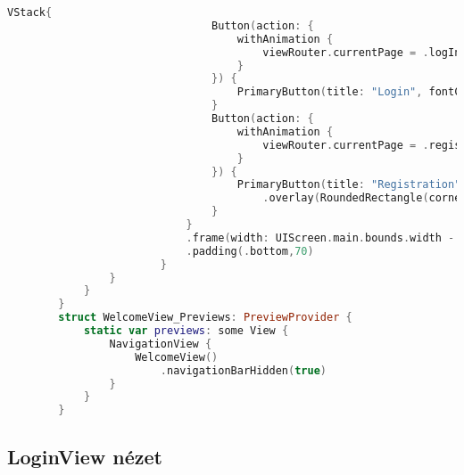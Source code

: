 \begin{minipage}{\textwidth}
\begin{lstlisting}[language=swift]
                            VStack{
                                Button(action: {
                                    withAnimation {
                                        viewRouter.currentPage = .logInPage
                                    }
                                }) {
                                    PrimaryButton(title: "Login", fontColor: Color.theme.white, backgroundColor: Color.theme.lighBlue)
                                }
                                Button(action: {
                                    withAnimation {
                                        viewRouter.currentPage = .registerPage
                                    }
                                }) {
                                    PrimaryButton(title: "Registration", fontColor: Color.theme.lighBlue, backgroundColor: Color.theme.darkGray)
                                        .overlay(RoundedRectangle(cornerRadius: 5).strokeBorder(Color.theme.lighBlue, lineWidth: 1))
                                }
                            }
                            .frame(width: UIScreen.main.bounds.width - 32)
                            .padding(.bottom,70)
                        }
                }
            }
        }
        struct WelcomeView_Previews: PreviewProvider {
            static var previews: some View {
                NavigationView {
                    WelcomeView()
                        .navigationBarHidden(true)
                }
            }
        }
    \end{lstlisting}   
\end{minipage}


\subsection*{LoginView nézet}

